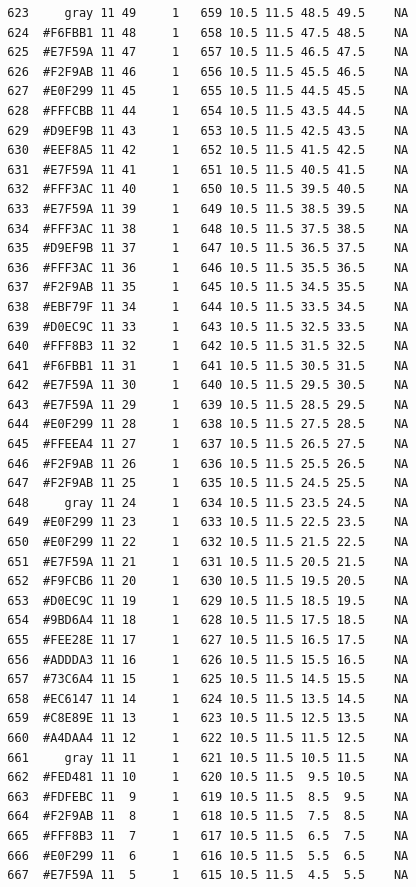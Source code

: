 \documentclass[12pt,twoside]{reedthesis}
\begin{document}
\begin{verbatim}
  623     gray 11 49     1   659 10.5 11.5 48.5 49.5    NA
  624  #F6FBB1 11 48     1   658 10.5 11.5 47.5 48.5    NA
  625  #E7F59A 11 47     1   657 10.5 11.5 46.5 47.5    NA
  626  #F2F9AB 11 46     1   656 10.5 11.5 45.5 46.5    NA
  627  #E0F299 11 45     1   655 10.5 11.5 44.5 45.5    NA
  628  #FFFCBB 11 44     1   654 10.5 11.5 43.5 44.5    NA
  629  #D9EF9B 11 43     1   653 10.5 11.5 42.5 43.5    NA
  630  #EEF8A5 11 42     1   652 10.5 11.5 41.5 42.5    NA
  631  #E7F59A 11 41     1   651 10.5 11.5 40.5 41.5    NA
  632  #FFF3AC 11 40     1   650 10.5 11.5 39.5 40.5    NA
  633  #E7F59A 11 39     1   649 10.5 11.5 38.5 39.5    NA
  634  #FFF3AC 11 38     1   648 10.5 11.5 37.5 38.5    NA
  635  #D9EF9B 11 37     1   647 10.5 11.5 36.5 37.5    NA
  636  #FFF3AC 11 36     1   646 10.5 11.5 35.5 36.5    NA
  637  #F2F9AB 11 35     1   645 10.5 11.5 34.5 35.5    NA
  638  #EBF79F 11 34     1   644 10.5 11.5 33.5 34.5    NA
  639  #D0EC9C 11 33     1   643 10.5 11.5 32.5 33.5    NA
  640  #FFF8B3 11 32     1   642 10.5 11.5 31.5 32.5    NA
  641  #F6FBB1 11 31     1   641 10.5 11.5 30.5 31.5    NA
  642  #E7F59A 11 30     1   640 10.5 11.5 29.5 30.5    NA
  643  #E7F59A 11 29     1   639 10.5 11.5 28.5 29.5    NA
  644  #E0F299 11 28     1   638 10.5 11.5 27.5 28.5    NA
  645  #FFEEA4 11 27     1   637 10.5 11.5 26.5 27.5    NA
  646  #F2F9AB 11 26     1   636 10.5 11.5 25.5 26.5    NA
  647  #F2F9AB 11 25     1   635 10.5 11.5 24.5 25.5    NA
  648     gray 11 24     1   634 10.5 11.5 23.5 24.5    NA
  649  #E0F299 11 23     1   633 10.5 11.5 22.5 23.5    NA
  650  #E0F299 11 22     1   632 10.5 11.5 21.5 22.5    NA
  651  #E7F59A 11 21     1   631 10.5 11.5 20.5 21.5    NA
  652  #F9FCB6 11 20     1   630 10.5 11.5 19.5 20.5    NA
  653  #D0EC9C 11 19     1   629 10.5 11.5 18.5 19.5    NA
  654  #9BD6A4 11 18     1   628 10.5 11.5 17.5 18.5    NA
  655  #FEE28E 11 17     1   627 10.5 11.5 16.5 17.5    NA
  656  #ADDDA3 11 16     1   626 10.5 11.5 15.5 16.5    NA
  657  #73C6A4 11 15     1   625 10.5 11.5 14.5 15.5    NA
  658  #EC6147 11 14     1   624 10.5 11.5 13.5 14.5    NA
  659  #C8E89E 11 13     1   623 10.5 11.5 12.5 13.5    NA
  660  #A4DAA4 11 12     1   622 10.5 11.5 11.5 12.5    NA
  661     gray 11 11     1   621 10.5 11.5 10.5 11.5    NA
  662  #FED481 11 10     1   620 10.5 11.5  9.5 10.5    NA
  663  #FDFEBC 11  9     1   619 10.5 11.5  8.5  9.5    NA
  664  #F2F9AB 11  8     1   618 10.5 11.5  7.5  8.5    NA
  665  #FFF8B3 11  7     1   617 10.5 11.5  6.5  7.5    NA
  666  #E0F299 11  6     1   616 10.5 11.5  5.5  6.5    NA
  667  #E7F59A 11  5     1   615 10.5 11.5  4.5  5.5    NA

\end{verbatim}
\end{document}
